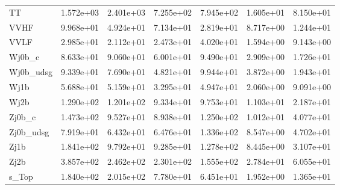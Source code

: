 \begin{table}
{\begin{tabularx}{\textwidth}{|X|X|X|X|X|X|X|}
\hline
TT & 1.572e+03 & 2.401e+03 & 7.255e+02 & 7.945e+02 & 1.605e+01 & 8.150e+01 \\
VVHF & 9.968e+01 & 4.924e+01 & 7.134e+01 & 2.819e+01 & 8.717e+00 & 1.244e+01 \\
VVLF & 2.985e+01 & 2.112e+01 & 2.473e+01 & 4.020e+01 & 1.594e+00 & 9.143e+00 \\
Wj0b\_c & 8.633e+01 & 9.060e+01 & 6.001e+01 & 9.490e+01 & 2.909e+00 & 1.726e+01 \\
Wj0b\_udsg & 9.339e+01 & 7.690e+01 & 4.821e+01 & 9.944e+01 & 3.872e+00 & 1.943e+01 \\
Wj1b & 5.688e+01 & 5.159e+01 & 3.295e+01 & 4.947e+01 & 2.060e+00 & 9.091e+00 \\
Wj2b & 1.290e+02 & 1.201e+02 & 9.334e+01 & 9.753e+01 & 1.103e+01 & 2.187e+01 \\
Zj0b\_c & 1.473e+02 & 9.527e+01 & 8.938e+01 & 1.250e+02 & 1.012e+01 & 4.077e+01 \\
Zj0b\_udsg & 7.919e+01 & 6.432e+01 & 6.476e+01 & 1.336e+02 & 8.547e+00 & 4.702e+01 \\
Zj1b & 1.841e+02 & 9.792e+01 & 9.285e+01 & 1.278e+02 & 8.445e+00 & 3.107e+01 \\
Zj2b & 3.857e+02 & 2.462e+02 & 2.301e+02 & 1.555e+02 & 2.784e+01 & 6.055e+01 \\
s\_Top & 1.840e+02 & 2.015e+02 & 7.780e+01 & 6.451e+01 & 1.952e+00 & 1.365e+01 \\
\hline
\end{tabularx}
}
\label{tab:sr-Znn-2017}
\end{table}

